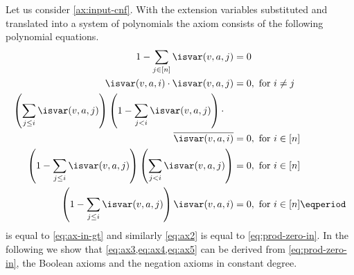 Let us consider \cref{ax:input-cnf}. With the extension variables
substituted and translated into a system of polynomials the axiom
consists of the following polynomial equations.
\begin{align}
  \label{eq:ax1}
  1 - \sum_{j \in [n]} \isvar(v,a,j) &= 0\\
  \label{eq:ax2}
  \isvar(v,a,i) \cdot \isvar(v,a,j) &= 0,
  \text{ for~}i \neq j\\
  \nonumber
  \left(\sum_{j \le i} \isvar(v,a,j)\right)
  \left(1 - \sum_{j < i} \isvar(v,a,j)\right)\cdot\quad&\\
  \label{eq:ax3}
  \overline{\isvar(v,a,i)} &= 0,
  \text{ for~}i \in [n]\\
  \label{eq:ax4}
  \left(1 - \sum_{j \le i} \isvar(v,a,j)\right)
  \left(\sum_{j < i} \isvar(v,a,j)\right) &= 0,
  \text{ for~}i \in [n]\\
  \label{eq:ax5}
  \left(1 - \sum_{j \le i} \isvar(v,a,j)\right)
  \isvar(v,a,i) &= 0,
  \text{ for~}i \in [n] \eqperiod
\end{align}
 is equal to \cref{eq:ax-in-gt} and similarly
\cref{eq:ax2} is equal to \cref{eq:prod-zero-in}. In the following we
show that \cref{eq:ax3,eq:ax4,eq:ax5} can be derived from
\cref{eq:prod-zero-in}, the Boolean axioms and the negation axioms in
constant degree.

